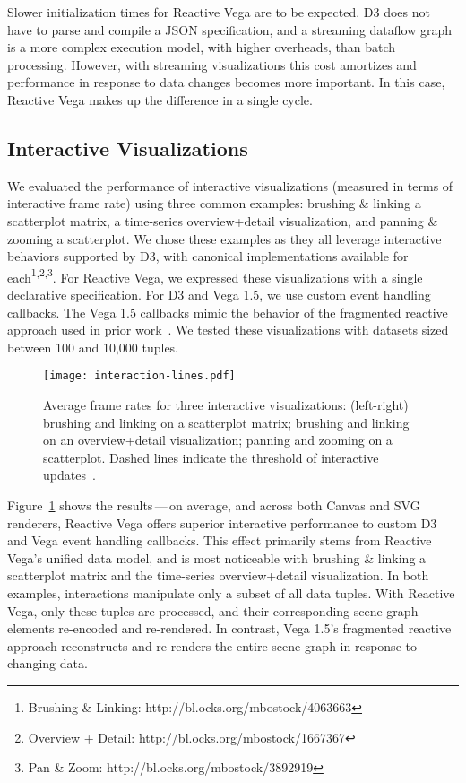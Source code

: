 Slower initialization times for Reactive Vega are to be expected. D3 does not
have to parse and compile a JSON specification, and a streaming dataflow graph
is a more complex execution model, with higher overheads, than batch processing.
However, with streaming visualizations this cost amortizes and performance in
response to data changes becomes more important. In this case, Reactive Vega
makes up the difference in a single cycle.

\vspace{-10pt}

\subsection{Interactive Visualizations}

\vspace{-7pt}

We evaluated the performance of interactive visualizations (measured in terms of
interactive frame rate) using three common examples: brushing \& linking a
scatterplot matrix, a time-series overview+detail visualization, and panning \&
zooming a scatterplot. We chose these examples as they all leverage interactive
behaviors supported by D3, with canonical implementations available for
each\footnote{Brushing \& Linking:
http://bl.ocks.org/mbostock/4063663}\textsuperscript{,}\footnote{Overview +
Detail: http://bl.ocks.org/mbostock/1667367}\textsuperscript{,}\footnote{Pan \&
Zoom: http://bl.ocks.org/mbostock/3892919}. For Reactive Vega, we expressed
these visualizations with a single declarative specification. For D3 and Vega
1.5, we use custom event handling callbacks. The Vega 1.5 callbacks mimic the
behavior of the fragmented reactive approach used in prior
work~\cite{satyanarayan:declarative}. We tested these visualizations with
datasets sized between 100 and 10,000 tuples.

\begin{figure}[t!]
  \centering
  \texttt{[image: interaction-lines.pdf]}
  \caption{Average frame rates for three interactive visualizations: (left-right)
  brushing and linking on a scatterplot matrix; brushing and linking on an
  overview+detail visualization; panning and zooming on a scatterplot. Dashed
  lines indicate the threshold of interactive updates~\cite{card:modelhuman}.}
  \label{fig:vg:interactive_benchmark}
\end{figure}

Figure~\ref{fig:vg:interactive_benchmark} shows the results\,---\,on average,
and across both Canvas and SVG renderers, Reactive Vega offers superior
interactive performance to custom D3 and Vega event handling callbacks. This
effect primarily stems from Reactive Vega's unified data model, and is most
noticeable with brushing \& linking a scatterplot matrix and the time-series
overview+detail visualization. In both examples, interactions manipulate only a
subset of all data tuples. With Reactive Vega, only these tuples are processed,
and their corresponding scene graph elements re-encoded and re-rendered. In
contrast, Vega 1.5's fragmented reactive approach reconstructs and re-renders
the entire scene graph in response to changing data.